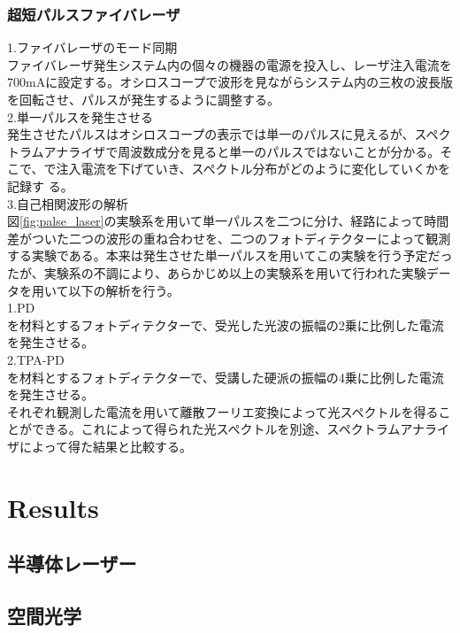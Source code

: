 \documentclass[titlepage]{jsarticle}
\begin{document}
\subsubsection{超短パルスファイバレーザ}
1.ファイバレーザのモード同期\\
    ファイバレーザ発生システム内の個々の機器の電源を投入し、レーザ注入電流を700mAに設定する。オシロスコープで波形を見ながらシステム内の三枚の波長版を回転させ、パルスが発生するように調整する。\\
2.単一パルスを発生させる\\
    発生させたパルスはオシロスコープの表示では単一のパルスに見えるが、スペクトラムアナライザで周波数成分を見ると単一のパルスではないことが分かる。そこで、で注入電流を下げていき、スペクトル分布がどのように変化していくかを記録す
    る。\\
3.自己相関波形の解析\\
    図\ref{fig;palse_laser}の実験系を用いて単一パルスを二つに分け、経路によって時間差がついた二つの波形の重ね合わせを、二つのフォトディテクターによって観測する実験である。本来は発生させた単一パルスを用いてこの実験を行う予定だったが、実験系の不調により、あらかじめ以上の実験系を用いて行われた実験データを用いて以下の解析を行う。\\
    1.PD\\
        を材料とするフォトディテクターで、受光した光波の振幅の2乗に比例した電流を発生させる。\\
    2.TPA-PD\\
        を材料とするフォトディテクターで、受講した硬派の振幅の4乗に比例した電流を発生させる。\\
    それぞれ観測した電流を用いて離散フーリエ変換によって光スペクトルを得ることができる。これによって得られた光スペクトルを別途、スペクトラムアナライザによって得た結果と比較する。\\



\section{Results}
\subsection{半導体レーザー}

\subsection{空間光学}
\end{document}
